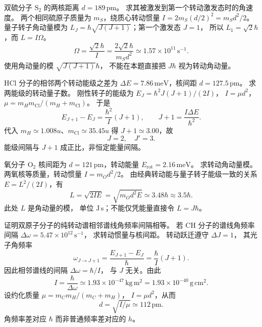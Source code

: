 
双硫分子 $\mathrm{S_2}$ 的两核距离 $d=189\,\mathrm{pm}$。
求其被激发到第一个转动激发态时的角速度。
\exsolution
两个相同硫原子质量为 $m_S$，绕质心转动惯量
$I=2m_S(d/2)^2=m_Sd^2/2$。
量子转子角动量模为
$L_J=\hbar\sqrt{J(J+1)}$；第一个激发态 $J=1$，
所以 $L_1=\sqrt2\hbar$，而 $L=I\Omega$。
\[
 \boxed{\Omega=\frac{\sqrt2\hbar}{I}
 =\frac{2\sqrt2\hbar}{m_Sd^2}
 \simeq1.57\times10^{11}\,\mathrm{s^{-1}}}.
\]
\excheck 使用角动量的模 $\sqrt{J(J+1)}\hbar$，
不能在本题直接把 $J\hbar$ 视为转动角动量。

HCl 分子的相邻两个转动能级之差为
$\Delta E=7.86\,\mathrm{meV}$，核间距
$d=127.5\,\mathrm{pm}$。
求两能级的转动量子数。
\exsolution
刚性转子的能级为
$E_J=\hbar^2J(J+1)/(2I)$，
$I=\mu d^2$，
$\mu=m_Hm_{\mathrm{Cl}}/(m_H+m_{\mathrm{Cl}})$。
于是
\[
 E_{J+1}-E_J=\frac{\hbar^2}{I}(J+1),\qquad
 J+1=\frac{I\Delta E}{\hbar^2}.
\]
代入 $m_H\simeq1.008u$、$m_{\mathrm{Cl}}\simeq35.45u$
得 $J+1\simeq3.00$，故
\[
 \boxed{J=2,\quad J'=3}.
\]
\excheck 能级间隔与 $J+1$ 成正比，非恒定能量间隔。

氧分子 $\mathrm{O_2}$ 核间距为
$d=121\,\mathrm{pm}$，转动能量
$E_{\mathrm{rot}}=2.16\,\mathrm{meV}$。
求转动角动量模。
\exsolution
两氧核等质量，转动惯量
$I=m_Od^2/2$。
由经典转动能与量子转子能级一致的关系
$E=L^2/(2I)$，有
\[
 \boxed{L=\sqrt{2IE}
 =\sqrt{m_Od^2E}
 \simeq3.48\hbar\approx3.5\hbar}.
\]
\excheck 此处 $L$ 是角动量的模，
单位 $\mathrm{J\,s}$；不能仅凭能量直接令 $L=J\hbar$。

证明双原子分子的纯转动谱相邻谱线角频率间隔相等。
若 CH 分子的谱线角频率间隔
$\Delta\omega=5.47\times10^{12}\,\mathrm{s^{-1}}$，
求转动惯量与核间距。
\exsolution
转动跃迁遵守 $\Delta J=1$，
其光子角频率
\[
 \omega_{J\to J+1}=
 \frac{E_{J+1}-E_J}{\hbar}
 =\frac{\hbar}{I}(J+1).
\]
因此相邻谱线的间隔
$\Delta\omega=\hbar/I$，
与 $J$ 无关。由此
\[
 \boxed{I=\frac{\hbar}{\Delta\omega}
 \simeq1.93\times10^{-47}\,\mathrm{kg\,m^2}
 =1.93\times10^{-40}\,\mathrm{g\,cm^2}}.
\]
设约化质量 $\mu=m_Cm_H/(m_C+m_H)$，
$I=\mu d^2$，从而
\[
 \boxed{d=\sqrt{I/\mu}\simeq112\,\mathrm{pm}}.
\]
\excheck 角频率差对应 $\hbar$ 而非普通频率差对应的 $h$。

